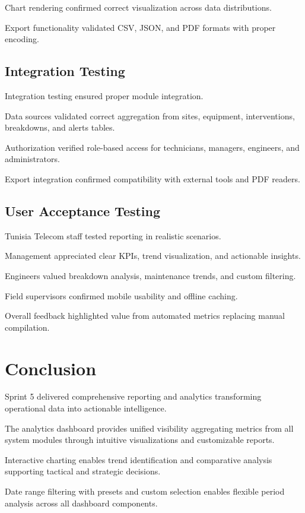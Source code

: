 Chart rendering confirmed correct visualization across data distributions.

Export functionality validated CSV, JSON, and PDF formats with proper encoding.

\subsection{Integration Testing}

Integration testing ensured proper module integration.

Data sources validated correct aggregation from sites, equipment, interventions, breakdowns, and alerts tables.

Authorization verified role-based access for technicians, managers, engineers, and administrators.

Export integration confirmed compatibility with external tools and PDF readers.

\subsection{User Acceptance Testing}

Tunisia Telecom staff tested reporting in realistic scenarios.

Management appreciated clear KPIs, trend visualization, and actionable insights.

Engineers valued breakdown analysis, maintenance trends, and custom filtering.

Field supervisors confirmed mobile usability and offline caching.

Overall feedback highlighted value from automated metrics replacing manual compilation.

\section{Conclusion}

Sprint 5 delivered comprehensive reporting and analytics transforming operational data into actionable intelligence.

The analytics dashboard provides unified visibility aggregating metrics from all system modules through intuitive visualizations and customizable reports.

Interactive charting enables trend identification and comparative analysis supporting tactical and strategic decisions.

Date range filtering with presets and custom selection enables flexible period analysis across all dashboard components.

